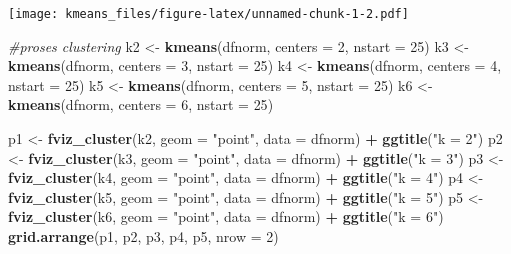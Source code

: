 \documentclass[]{article}
\newenvironment{Shaded}{\begin{snugshade}}{\end{snugshade}}
\newcommand{\CommentTok}[1]{\textcolor[rgb]{0.56,0.35,0.01}{\textit{#1}}}
\newcommand{\DataTypeTok}[1]{\textcolor[rgb]{0.13,0.29,0.53}{#1}}
\newcommand{\DecValTok}[1]{\textcolor[rgb]{0.00,0.00,0.81}{#1}}
\newcommand{\KeywordTok}[1]{\textcolor[rgb]{0.13,0.29,0.53}{\textbf{#1}}}
\newcommand{\NormalTok}[1]{#1}
\newcommand{\OperatorTok}[1]{\textcolor[rgb]{0.81,0.36,0.00}{\textbf{#1}}}
\newcommand{\StringTok}[1]{\textcolor[rgb]{0.31,0.60,0.02}{#1}}
\begin{document}
\texttt{[image: kmeans\_files/figure-latex/unnamed-chunk-1-2.pdf]}

\begin{Shaded}
\begin{Highlighting}[]
\CommentTok{#proses clustering}
\NormalTok{k2 <-}\StringTok{ }\KeywordTok{kmeans}\NormalTok{(dfnorm, }\DataTypeTok{centers =} \DecValTok{2}\NormalTok{, }\DataTypeTok{nstart =} \DecValTok{25}\NormalTok{)}
\NormalTok{k3 <-}\StringTok{ }\KeywordTok{kmeans}\NormalTok{(dfnorm, }\DataTypeTok{centers =} \DecValTok{3}\NormalTok{, }\DataTypeTok{nstart =} \DecValTok{25}\NormalTok{)}
\NormalTok{k4 <-}\StringTok{ }\KeywordTok{kmeans}\NormalTok{(dfnorm, }\DataTypeTok{centers =} \DecValTok{4}\NormalTok{, }\DataTypeTok{nstart =} \DecValTok{25}\NormalTok{)}
\NormalTok{k5 <-}\StringTok{ }\KeywordTok{kmeans}\NormalTok{(dfnorm, }\DataTypeTok{centers =} \DecValTok{5}\NormalTok{, }\DataTypeTok{nstart =} \DecValTok{25}\NormalTok{)}
\NormalTok{k6 <-}\StringTok{ }\KeywordTok{kmeans}\NormalTok{(dfnorm, }\DataTypeTok{centers =} \DecValTok{6}\NormalTok{, }\DataTypeTok{nstart =} \DecValTok{25}\NormalTok{)}


\NormalTok{p1 <-}\StringTok{ }\KeywordTok{fviz_cluster}\NormalTok{(k2, }\DataTypeTok{geom =} \StringTok{"point"}\NormalTok{, }\DataTypeTok{data =}\NormalTok{ dfnorm) }\OperatorTok{+}\StringTok{ }\KeywordTok{ggtitle}\NormalTok{(}\StringTok{"k = 2"}\NormalTok{)}
\NormalTok{p2 <-}\StringTok{ }\KeywordTok{fviz_cluster}\NormalTok{(k3, }\DataTypeTok{geom =} \StringTok{"point"}\NormalTok{, }\DataTypeTok{data =}\NormalTok{ dfnorm) }\OperatorTok{+}\StringTok{ }\KeywordTok{ggtitle}\NormalTok{(}\StringTok{"k = 3"}\NormalTok{)}
\NormalTok{p3 <-}\StringTok{ }\KeywordTok{fviz_cluster}\NormalTok{(k4, }\DataTypeTok{geom =} \StringTok{"point"}\NormalTok{, }\DataTypeTok{data =}\NormalTok{ dfnorm) }\OperatorTok{+}\StringTok{ }\KeywordTok{ggtitle}\NormalTok{(}\StringTok{"k = 4"}\NormalTok{)}
\NormalTok{p4 <-}\StringTok{ }\KeywordTok{fviz_cluster}\NormalTok{(k5, }\DataTypeTok{geom =} \StringTok{"point"}\NormalTok{, }\DataTypeTok{data =}\NormalTok{ dfnorm) }\OperatorTok{+}\StringTok{ }\KeywordTok{ggtitle}\NormalTok{(}\StringTok{"k = 5"}\NormalTok{)}
\NormalTok{p5 <-}\StringTok{ }\KeywordTok{fviz_cluster}\NormalTok{(k6, }\DataTypeTok{geom =} \StringTok{"point"}\NormalTok{, }\DataTypeTok{data =}\NormalTok{ dfnorm) }\OperatorTok{+}\StringTok{ }\KeywordTok{ggtitle}\NormalTok{(}\StringTok{"k = 6"}\NormalTok{)}
\KeywordTok{grid.arrange}\NormalTok{(p1, p2, p3, p4, p5, }\DataTypeTok{nrow =} \DecValTok{2}\NormalTok{)}
\end{Highlighting}
\end{Shaded}
\end{document}
